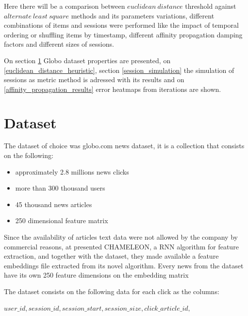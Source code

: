 \documentclass[ecp,tc,english]{iiufrgs}
\begin{document}
    Here there will be a comparison between \(euclidean\ distance\) threshold against \(alternate\ least\ square\) methods and its parameters variations, different combinations of items and sessions were performed like the impact of temporal ordering or shuffling items by timestamp, different affinity propagation damping factors and different sizes of sessions.
    
    On section \ref{globo_dot_com_dataset} Globo dataset properties are presented, on \ref{euclidean_distance_heuristic}, section \ref{session_simulation} the simulation of sessions as metric method is adressed with its results and on \ref{affinity_propagation_results} error heatmaps from iterations are shown.

    \section{Dataset} \label{globo_dot_com_dataset}
    The dataset of choice was globo.com news dataset, it is a collection that consists on the following:
    \begin{itemize}
        \item approximately 2.8 millions news clicks
        \item more than 300 thousand users
        \item 45 thousand news articles
        \item 250 dimensional feature matrix
    \end{itemize}
    
    Since the availability of articles text data were not allowed by the company by commercial reasons, at \cite{moreira2018chameleon} presented CHAMELEON, a RNN algorithm for feature extraction, and together with the dataset, they made available a feature embeddings file extracted from its novel algorithm. Every news from the dataset have its own 250 feature dimensions on the embedding matrix
    
    The dataset consists on the following data for each click as the columns:
    
    \(user\_id, session\_id, session\_start, session\_size, click\_article\_id,\) 
    
\end{document}
